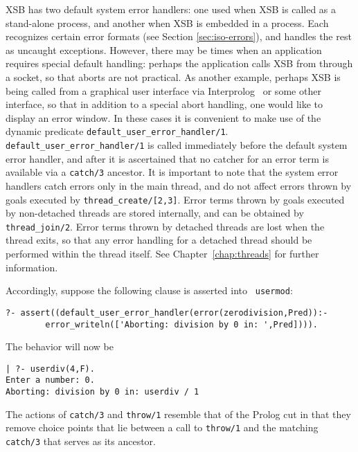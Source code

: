 XSB has two default system error handlers: one used when XSB is called
as a stand-alone process, and another when XSB is embedded in a
process.  Each recognizes certain error formats (see Section
\ref{sec:iso-errors}), and handles the rest as uncaught exceptions.
However, there may be times when an application requires special
default handling: perhaps the application calls XSB from through a
socket, so that aborts are not practical.  As another example, perhaps
XSB is being called from a graphical user interface via
Interprolog~\cite{Cale01} or some other interface, so that in addition
to a special abort handling, one would like to display an error
window.  In these cases it is convenient to make use of the dynamic
predicate {\tt default\_user\_error\_handler/1}.  {\tt
  default\_user\_error\_handler/1} is called immediately before the
default system error handler, and after it is ascertained that no
catcher for an error term is available via a {\tt catch/3} ancestor.
It is important to note that the system error handlers catch errors
only in the main thread, and do not affect errors thrown by goals
executed by {\tt thread\_create/[2,3]}.  Error terms thrown by goals
executed by non-detached threads are stored internally, and can be
obtained by {\tt thread\_join/2}.  Error terms thrown by detached
threads are lost when the thread exits, so that any error handling for
a detached thread should be performed within the thread itself.  See
Chapter~\ref{chap:threads} for further information.

Accordingly, suppose the following clause is asserted into {\tt
usermod}:
%
\begin{small}
\begin{verbatim}
?- assert((default_user_error_handler(error(zerodivision,Pred)):- 
        error_writeln(['Aborting: division by 0 in: ',Pred]))).
\end{verbatim}
\end{small}
%
The behavior will now be
\begin{small}
\begin{verbatim}
| ?- userdiv(4,F).
Enter a number: 0.
Aborting: division by 0 in: userdiv / 1
\end{verbatim}
\end{small}
The actions of {\tt catch/3} and {\tt throw/1} resemble that of the
Prolog cut in that they remove choice points that lie between a call
to {\tt throw/1} and the matching {\tt catch/3} that serves as its
ancestor. 


